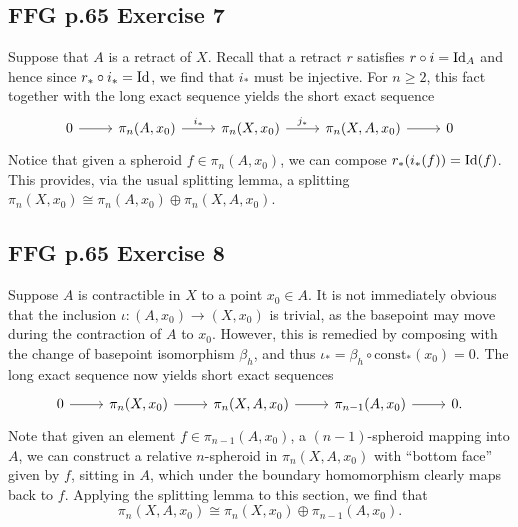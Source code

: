\documentclass{../mathnotes}
\begin{document}
\subsection*{FFG p.65 Exercise 7}
Suppose that $A$ is a retract of $X$. Recall that a retract $r$ satisfies $r\circ i=\operatorname{Id}_A$
and hence since $r_*\circ i_*=\operatorname{Id}$, we find that $i_*$ must be injective. For $n\geq 2$, this
fact together with the long exact sequence yields the short exact sequence
\begin{equation*}
    \begin{tikzcd}
        0\ar{r} &\pi_n(A,x_0)\ar{r}{i_*} & \pi_n(X,x_0)\ar{r}{j_*} & \pi_n(X,A,x_0)\ar{r} & 0
    \end{tikzcd}
\end{equation*}
Notice that given a spheroid $f\in\pi_n(A,x_0)$, we can compose $r_*(i_*(f))=\operatorname{Id}(f)$. This provides,
via the usual splitting lemma, a splitting $\pi_n(X,x_0)\cong \pi_n(A,x_0)\oplus\pi_n(X,A,x_0)$.

\subsection*{FFG p.65 Exercise 8}
Suppose $A$ is contractible in $X$ to a point $x_0\in A$. It is not immediately obvious that the
inclusion $\iota:(A,x_0)\to(X,x_0)$ is trivial, as the basepoint may move during the contraction of
$A$ to $x_0$. However, this is remedied by composing with the change of basepoint isomorphism $\beta_h$,
and thus $\iota_*=\beta_h\circ\text{const}_*(x_0)=0$. The long exact sequence now yields short exact
sequences
\begin{equation*}
    \begin{tikzcd}
        0\ar{r} & \pi_n(X,x_0)\ar{r} & \pi_n(X,A,x_0)\ar{r} & \pi_{n-1}(A,x_0)\ar{r} & 0.
    \end{tikzcd}
\end{equation*}
Note that given an element $f\in\pi_{n-1}(A,x_0)$, a $(n-1)$-spheroid mapping into $A$, we
can construct a relative $n$-spheroid in $\pi_n(X,A,x_0)$ with ``bottom face'' given by $f$, sitting in
$A$, which under the boundary homomorphism clearly maps back to $f$. Applying the splitting lemma
to this section, we find that
\[\pi_n(X,A,x_0)\cong \pi_n(X,x_0)\oplus\pi_{n-1}(A,x_0).\]
\end{document}
